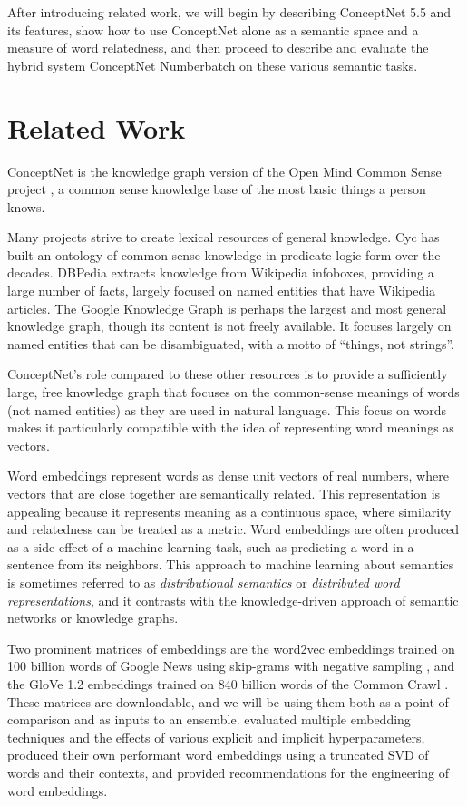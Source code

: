 \documentclass[letterpaper]{article}
\begin{document}
After introducing related work, we will begin by describing ConceptNet 5.5 and
its features, show how to use ConceptNet alone as a semantic space and a
measure of word relatedness, and then proceed to describe and evaluate the
hybrid system ConceptNet Numberbatch on these various semantic tasks.

\section{Related Work}

ConceptNet is the knowledge graph version of the Open Mind
Common Sense project \cite{singh2002omcs}, a common sense knowledge base
of the most basic things a person knows.

Many projects strive to create lexical resources of general knowledge.  Cyc
\cite{lenat1989cyc} has built an ontology of common-sense knowledge in
predicate logic form over the decades. DBPedia \cite{auer2007dbpedia} extracts
knowledge from Wikipedia infoboxes, providing a large number of facts, largely
focused on named entities that have Wikipedia articles. The Google Knowledge
Graph \cite{singhal2012googleblog} is perhaps the largest and most general
knowledge graph, though its content is not freely available. It focuses largely
on named entities that can be disambiguated, with a motto of ``things, not
strings''.

ConceptNet's role compared to these other resources is to provide a
sufficiently large, free knowledge graph that focuses on the common-sense
meanings of words (not named entities) as they are used in natural language.
This focus on words makes it particularly compatible with the idea of
representing word meanings as vectors.

Word embeddings represent words as dense unit vectors of real numbers, where
vectors that are close together are semantically related. This representation
is appealing because it represents meaning as a continuous space, where
similarity and relatedness can be treated as a metric. Word embeddings are
often produced as a side-effect of a machine learning task, such as predicting
a word in a sentence from its neighbors.  This approach to machine learning
about semantics is sometimes referred to as \emph{distributional semantics} or
\emph{distributed word representations}, and it contrasts with the
knowledge-driven approach of semantic networks or knowledge graphs.

Two prominent matrices of embeddings are the word2vec embeddings trained on 100
billion words of Google News using skip-grams with negative sampling
\cite{mikolov2013word2vec}, and the GloVe 1.2 embeddings trained on 840 billion
words of the Common Crawl \cite{pennington2014glove}. These matrices are
downloadable, and we will be using them both as a point of comparison and as
inputs to an ensemble. \citeauthor{levy2015embeddings}
 evaluated multiple embedding techniques and the
effects of various explicit and implicit hyperparameters, produced their own
performant word embeddings using a truncated SVD of words and their contexts,
and provided recommendations for the engineering of word embeddings.
\end{document}
